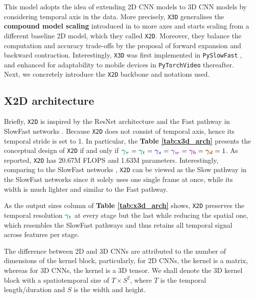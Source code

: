 \label{sec:method}

This model adopts the idea of extending 2D CNN models to 3D CNN models by considering temporal axis in the data.
More precisely, \texttt{X3D} generalises the \textbf{compound model scaling} introduced in \cite{tan2019efficientnet} to more axes and starts scaling from a different baseline 2D model, which they called \texttt{X2D}.
Moreover, they balance the computation and accuracy trade-offs by the proposal of forward expansion and backward contraction.
Interestingly, \texttt{X3D} was first implemented in \texttt{PySlowFast} \cite{pyslowfast}, and enhanced for adaptability to mobile devices in \texttt{PyTorchVideo} \cite{fan2021pytorchvideo} thereafter.
Next, we concretely introduce the \texttt{X2D} backbone and notations used.

\subsection{X2D architecture}
\label{sec:x2d}

Briefly, \texttt{X2D} is inspired by the ResNet \cite{ResNet} architecture and the Fast pathway in SlowFast networks \cite{feichtenhofer2019slowfast}.
Because \texttt{X2D} does not consist of temporal axis, hence its temporal stride is set to 1.
In particular, the \textbf{Table \ref{tab:x3d_arch}} presents the conceptual design of \texttt{X2D} if and only if $\xgtau = \xgt = \xgs = \xgw = \xgb = \xgd = 1$.
As reported, \texttt{X2D} has 20.67M FLOPS and 1.63M parameters.
Interestingly, comparing to the SlowFast networks \cite{feichtenhofer2019slowfast}, \texttt{X2D} can be viewed as the Slow pathway in the SlowFast networks since it solely uses one single frame at once, while its width is much lighter and similar to the Fast pathway.

As the output sizes column of \textbf{Table \ref{tab:x3d_arch}} shows, \texttt{X2D} preserves the temporal resolution $\xgt$ at every stage but the last while reducing the spatial one, which resembles the SlowFast pathways \cite{feichtenhofer2019slowfast} and thus retains all temporal signal across features per stage.

The difference between 2D and 3D CNNs are attributed to the number of dimensions of the kernel block, particularly, for 2D CNNs, the kernel is a matrix, whereas for 3D CNNs, the kernel is a 3D tensor.
We shall denote the 3D kernel block with a spatiotemporal size of $T \times S^2$, where $T$ is the temporal length/duration and $S$ is the width and height.



